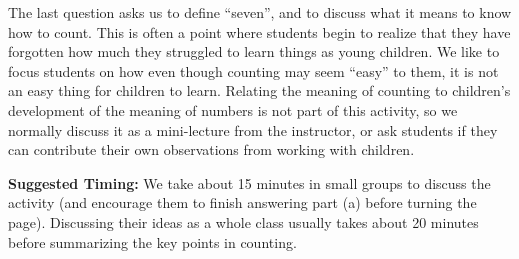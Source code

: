\documentclass[nooutcomes]{ximera}
\begin{document}
\begin{instructorNotes}
The last question asks us to define ``seven'', and to discuss what it means to know how to count.  This is often a point where students begin to realize that they have forgotten how much they struggled to learn things as young children.  We like to focus students on how even though counting may seem ``easy'' to them, it is not an easy thing for children to learn.
Relating the meaning of counting to children's development of the meaning of numbers is not part of this activity, so we normally discuss it as a mini-lecture from the instructor, or ask students if they can contribute their own observations from working with children.


{\bf Suggested Timing:} We take about 15 minutes in small groups to discuss the activity (and encourage them to finish answering part (a) before turning the page).  %
Discussing their ideas as a whole class usually takes about 20 minutes before summarizing the key points in counting.  



\end{instructorNotes}
\end{document}

